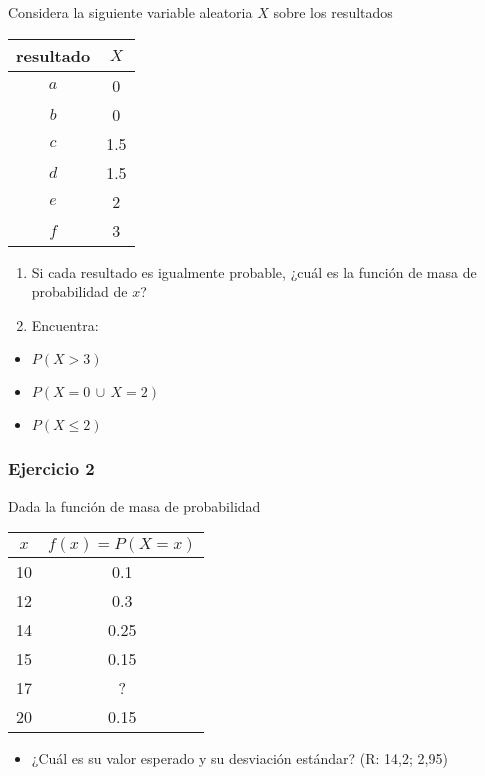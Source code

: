 \documentclass[
]{book}
\providecommand{\tightlist}{%
  \setlength{\itemsep}{0pt}\setlength{\parskip}{0pt}}
\begin{document}
Considera la siguiente variable aleatoria \(X\) sobre los resultados

\begin{longtable}[]{@{}cc@{}}
\toprule
resultado & \(X\) \\
\midrule
\endhead
\(a\) & 0 \\
\(b\) & 0 \\
\(c\) & 1.5 \\
\(d\) & 1.5 \\
\(e\) & 2 \\
\(f\) & 3 \\
\bottomrule
\end{longtable}

\begin{enumerate}
\def\labelenumi{\alph{enumi})}
\item
  Si cada resultado es igualmente probable, ¿cuál es la función de masa de probabilidad de \(x\)?
\item
  Encuentra:
\end{enumerate}

\begin{itemize}
\tightlist
\item
  \(P(X>3)\)
\item
  \(P(X=0\, \cup \, X=2 )\)
\item
  \(P(X \leq 2)\)
\end{itemize}

\hypertarget{ejercicio-2-2}{%
\subsubsection{Ejercicio 2}\label{ejercicio-2-2}}

Dada la función de masa de probabilidad

\begin{longtable}[]{@{}cc@{}}
\toprule
\(x\) & \(f(x)=P(X=x)\) \\
\midrule
\endhead
10 & 0.1 \\
12 & 0.3 \\
14 & 0.25 \\
15 & 0.15 \\
17 & ? \\
20 & 0.15 \\
\bottomrule
\end{longtable}

\begin{itemize}
\tightlist
\item
  ¿Cuál es su valor esperado y su desviación estándar? (R: 14,2; 2,95)
\end{itemize}
\end{document}
